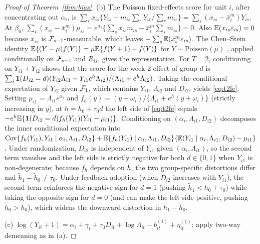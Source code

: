 \begin{proof}[Proof of Theorem~\ref{thm:bias}]
(b) The Poisson fixed-effects score for unit $i$, after concentrating out $\alpha_i$, is
$\sum_sx_{is}\{Y_{is}-m_{is}\sum_rY_{ir}/\sum_rm_{ir}\}=\sum_s(x_{is}-\bar x^m_i)Y_{is}$. At $\beta_0$,
$\sum_s(x_{is}-\bar x^m_i)\mu_{is}=e^{\alpha_i}\{\sum_sx_{is}m_{is}-\bar x^m_i\sum_sm_{is}\}=0$. Also
$\mathbb{E}(x_{is}\varepsilon_{is})=0$ because $x_{is}$ is $\mathcal{F}_{s-1}$-measurable, which leaves
$-\sum_s\mathbb{E}(\bar x^m_i\varepsilon_{is})$. The Chen--Stein identity $\mathbb{E}\{(Y-\mu)f(Y)\}=\mu\mathbb{E}\{f(Y+1)-f(Y)\}$
for $Y\sim\text{Poisson}(\mu)$ \citep{chen1975poisson}, applied conditionally on $\mathcal{F}_{s-1}$ and
$R_{is}$, gives the representation. For $T=2$, conditioning on $Y_{i1}+Y_{i2}$ shows that the score
for the week-2 effect of group $d$ is
$\sum_i\mathbf{1}(D_{i2}=d)(Y_{i2}\Lambda_{i1}-Y_{i1}e^{h}\Lambda_{i2})/(\Lambda_{i1}+e^h\Lambda_{i2})$. Taking the
conditional expectation of $Y_{i2}$ given $\mathcal{F}_1$, which contains $Y_{i1}$, $\Lambda_{i2}$ and $D_{i2}$,
yields \eqref{eq:t2fe}. Setting $\mu_{i1}=\Lambda_{i1}e^{\alpha_i}$ and
$f_h(y)=(y+\omega_i)/\{\Lambda_{i1}+e^h(y+\omega_i)\}$ (strictly increasing in $y$), at
$h=h_0+\tau_0 d$ the left side of \eqref{eq:t2fe} equals
$-e^h\mathbb{E}\{\mathbf{1}(D_{i2}=d)f_h(Y_{i1})(Y_{i1}-\mu_{i1})\}$. Conditioning on $(\alpha_i,\Lambda_{i1},D_{i2})$
decomposes the inner conditional expectation into
$\operatorname{Cov}\{f_h(Y_{i1}),Y_{i1}\mid\alpha_i,\Lambda_{i1},D_{i2}\}
+\mathbb{E}\{f_h(Y_{i1})\mid\alpha_i,\Lambda_{i1},D_{i2}\}\{\mathbb{E}(Y_{i1}\mid\alpha_i,\Lambda_{i1},D_{i2})-\mu_{i1}\}$.
Under randomization, $D_{i2}$ is independent of $Y_{i1}$ given $(\alpha_i,\Lambda_{i1})$, so the
second term vanishes and the left side is strictly negative for both $d\in\{0,1\}$ when $Y_{i1}$ is
non-degenerate; because $f_h$ depends on $h$, the two group-specific distortions differ and
$\tilde h_1-\tilde h_0\ne\tau_0$. Under feedback adoption (when $D_{i2}$ increases with $Y_{i1}$),
the second term reinforces the negative sign for $d=1$ (pushing $\tilde h_1<h_0+\tau_0$) while
taking the opposite sign for $d=0$ (and can make the left side positive, pushing $\tilde h_0>h_0$),
which widens the downward distortion in $\tilde h_1-\tilde h_0$.

(c) $\log(Y_{it}+1)=\alpha_i+\gamma_t+\tau_0D_{it}+\log\Lambda_{it}-b^{(1)}_{it}+\eta^{(1)}_{it}$; apply
two-way demeaning as in (a).


\end{proof}
